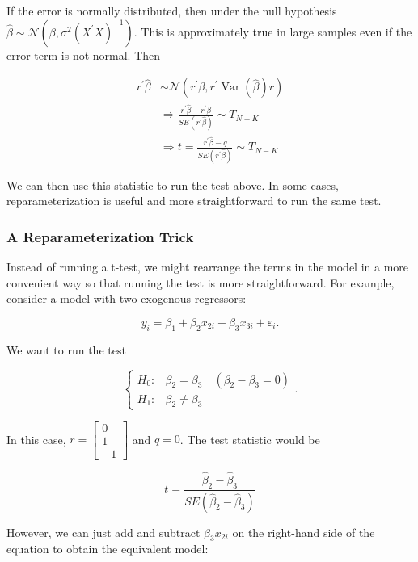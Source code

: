 If the error is normally distributed, then under the null hypothesis $\widehat{\beta} \sim \mathcal{N}\left(\beta, \sigma^{2}\left(X^{\prime} X\right)^{-1}\right)$. This is approximately true in large samples even if the error term is not normal. Then

$$
\begin{aligned}
r^{\prime} \widehat{\beta} & \sim \mathcal{N}\left(r^{\prime} \beta, r^{\prime} \operatorname{Var}(\widehat{\beta}) r\right) \\
& \Longrightarrow \frac{r^{\prime} \widehat{\beta}-r^{\prime} \beta}{S E\left(r^{\prime} \widehat{\beta}\right)} \sim T_{N-K} \\
& \Longrightarrow t=\frac{r^{\prime} \widehat{\beta}-q}{S E\left(r^{\prime} \widehat{\beta}\right)} \sim T_{N-K}
\end{aligned}
$$

We can then use this statistic to run the test above. In some cases, reparameterization is useful and more straightforward to run the same test.

\subsubsection{A Reparameterization Trick}
Instead of running a t-test, we might rearrange the terms in the model in a more convenient way so that running the test is more straightforward. For example, consider a model with two exogenous regressors:

$$
y_{i}=\beta_{1}+\beta_{2} x_{2 i}+\beta_{3} x_{3 i}+\varepsilon_{i} .
$$

We want to run the test

$$
\left\{\begin{array}{ll}
H_{0}: & \beta_{2}=\beta_{3} \quad\left(\beta_{2}-\beta_{3}=0\right) \\
H_{1}: & \beta_{2} \neq \beta_{3}
\end{array} .\right.
$$

In this case, $r=\left[\begin{array}{c}0 \\ 1 \\ -1\end{array}\right]$ and $q=0$. The test statistic would be

$$
t=\frac{\widehat{\beta}_{2}-\widehat{\beta}_{3}}{S E\left(\widehat{\beta}_{2}-\widehat{\beta}_{3}\right)}
$$

However, we can just add and subtract $\beta_{3} x_{2 i}$ on the right-hand side of the equation to obtain the equivalent model:

